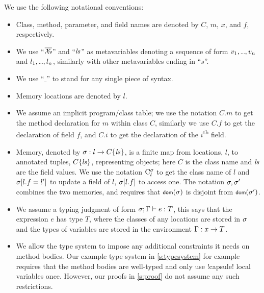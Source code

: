 We use the following notational conventions:
\begin{itemize}
	\item Class, method, parameter, and field names are denoted by $C$, $m$, $x$, and $f$, respectively.
	\item We use ``$\vs$'' and ``$\mathit{ls}$'' as metavariables denoting a sequence of form $\range{v}$ and $\range{l}$, similarly with other metavariables ending in ``$s$''.
	\item We use ``$\_$'' to stand for any single piece of syntax.
	\item Memory locations are denoted by $l$.
	\item We assume an implicit program/class table; we use the notation $C.m$ to get the method declaration for $m$ within class $C$, similarly we use $C.f$ to get the declaration of field $f$, and $C.i$ to get the declaration of the $i$\textsuperscript{th} field.
	\item Memory, denoted by $\sigma : l\rightarrow C\{\mathit{ls}\}$, is a finite map from locations, $l$, to annotated tuples, $C\{\mathit{ls}\}$, representing objects; here $C$ is the class name and $\mathit{ls}$ are the 
	field values.
	We use the notation $\mathrm{C}^{\sigma}_{l}$ to get the class name of $l$ and $\sigma[l.f=l']$ to update a field of $l$, $\sigma[l.f]$ to access one. The notation $\sigma,\sigma'$ combines the two memories, and requires that $\dom(\s)$ is disjoint from $\dom(\s')$.
	\item We assume a typing judgment of form $\ty{e}{T}$, this says that the expression $e$ has type $T$,
	where the classes of any locations are stored in $\sigma$ and the types of variables are stored in the environment $\Gamma : x\rightarrow T$.
	
	\item We allow the type system to impose any additional constraints it needs on method bodies.
	Our example type system in \autoref{s:typesystem} for example requires that the method bodies are well-typed and only use \Q!capsule! local variables once. However, our proofs in \autoref{s:proof} do not assume any such restrictions.
	
\end{itemize}

